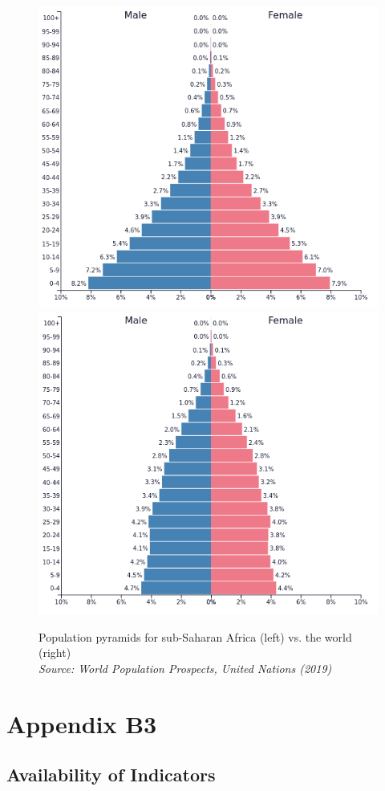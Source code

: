 \documentclass[
  a4paper, twoside, 12pt]{book}
\begin{document}
\begin{figure}[H]

{\centering \includegraphics[width=0.43\linewidth,]{figures/pp_ssa} \includegraphics[width=0.43\linewidth,]{figures/pp_world} 

}

\caption[Population pyramids for sub-Saharan Africa]{Population pyramids for sub-Saharan Africa (left) vs. the world (right) \\ \textit{\footnotesize{Source: World Population Prospects, United Nations (2019)}}}\label{fig:fig-pyramids}
\end{figure}

\newpage

\hypertarget{appendix-b}{%
\section*{Appendix B3}\label{appendix-b}}


\setcounter{figure}{0}
\renewcommand{\thefigure}{B3.\arabic{figure}}
\setcounter{table}{0}
\renewcommand{\thetable}{B3.\arabic{table}}

\hypertarget{availability}{%
\subsection*{Availability of Indicators}\label{availability}}
\end{document}
